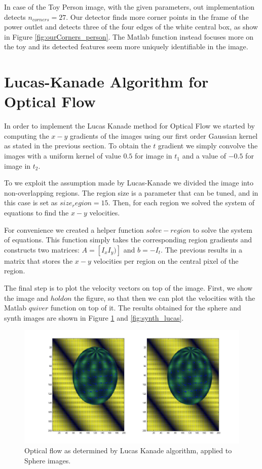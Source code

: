 \documentclass[11pt]{article}
\begin{document}
In case of the Toy Person image, with the given parameters, out implementation
detects $n_{corners} = 27$. Our detector finds more corner points in the frame
of the power outlet and detects three of the four edges of the white central
box, as show in Figure \ref{fig:ourCorners_person}. The Matlab function
instead focuses more on the toy and its detected features seem more uniquely
identifiable in the image.

\section{Lucas-Kanade Algorithm for Optical Flow}
In order to implement the Lucas Kanade method for Optical Flow we started by computing the $x-y$ gradients of the images using our first order Gaussian kernel as stated in the previous section. %
To obtain the $t$ gradient we simply convolve the images with a uniform kernel of value $0.5$ for image in $t_1$ and a value of $- 0.5$ for image in $t_2$. 

To we exploit the assumption made by Lucas-Kanade we divided the image into non-overlapping regions. The region size is a parameter that can be tuned, and in this case is set as $size_region = 15$. Then, for each region we solved the system of equations to find the $x-y$ velocities.

For convenience we created a helper function $solve-region$ to solve the system of equations. This function simply takes the corresponding region gradients and constructs two matrices: $A = [I_x I_y)]$ and $b = -I_t$. The previous results in a matrix that stores the $x-y$ velocities per region on the central pixel of the region. 

The final step is to plot the velocity vectors on top of the image. First, we show the image and $hold on$ the figure, so that then we can plot the velocities with the Matlab $quiver$ function on top of it. The results obtained for the sphere and synth images are shown in Figure \ref{fig:sphere_lucas} and \ref{fig:synth_lucas}.


\begin{figure}[H] \centering
	\includegraphics[width=.8\textwidth]{imgs/sphere.jpg}
	\caption{Optical flow as determined by Lucas Kanade algorithm, applied to Sphere images.}
	\label{fig:sphere_lucas}
\end{figure}
\end{document}

